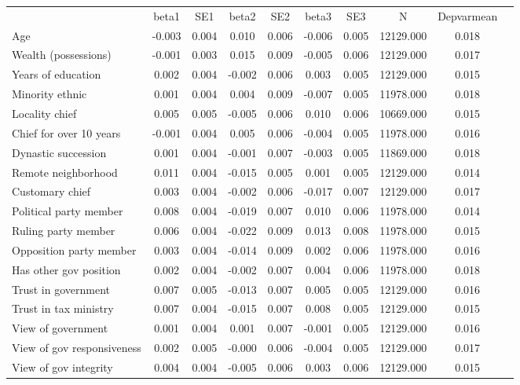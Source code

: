 {\def\sym#1{\ifmmode^{#1}\else\(^{#1}\)\fi} \begin{tabular}{l*{9}{c}} \hline\hline 
& beta1 & SE1 & beta2 & SE2 & beta3 & SE3 & N & Depvarmean \\
Age & -0.003 & 0.004 & 0.010 & 0.006 & -0.006 & 0.005 & 12129.000 & 0.018 \\
Wealth (possessions) & -0.001 & 0.003 & 0.015 & 0.009 & -0.005 & 0.006 & 12129.000 & 0.017 \\
Years of education & 0.002 & 0.004 & -0.002 & 0.006 & 0.003 & 0.005 & 12129.000 & 0.015 \\
Minority ethnic & 0.001 & 0.004 & 0.004 & 0.009 & -0.007 & 0.005 & 11978.000 & 0.018 \\
Locality chief & 0.005 & 0.005 & -0.005 & 0.006 & 0.010 & 0.006 & 10669.000 & 0.015 \\
Chief for over 10 years & -0.001 & 0.004 & 0.005 & 0.006 & -0.004 & 0.005 & 11978.000 & 0.016 \\
Dynastic succession & 0.001 & 0.004 & -0.001 & 0.007 & -0.003 & 0.005 & 11869.000 & 0.018 \\
Remote neighborhood & 0.011 & 0.004 & -0.015 & 0.005 & 0.001 & 0.005 & 12129.000 & 0.014 \\
Customary chief & 0.003 & 0.004 & -0.002 & 0.006 & -0.017 & 0.007 & 12129.000 & 0.017 \\
Political party member & 0.008 & 0.004 & -0.019 & 0.007 & 0.010 & 0.006 & 11978.000 & 0.014 \\
Ruling party member & 0.006 & 0.004 & -0.022 & 0.009 & 0.013 & 0.008 & 11978.000 & 0.015 \\
Opposition party member & 0.003 & 0.004 & -0.014 & 0.009 & 0.002 & 0.006 & 11978.000 & 0.016 \\
Has other gov position & 0.002 & 0.004 & -0.002 & 0.007 & 0.004 & 0.006 & 11978.000 & 0.018 \\
Trust in government & 0.007 & 0.005 & -0.013 & 0.007 & 0.005 & 0.005 & 12129.000 & 0.016 \\
Trust in tax ministry & 0.007 & 0.004 & -0.015 & 0.007 & 0.008 & 0.005 & 12129.000 & 0.015 \\
View of government & 0.001 & 0.004 & 0.001 & 0.007 & -0.001 & 0.005 & 12129.000 & 0.016 \\
View of gov responsiveness & 0.002 & 0.005 & -0.000 & 0.006 & -0.004 & 0.005 & 12129.000 & 0.017 \\
View of gov integrity & 0.004 & 0.004 & -0.005 & 0.006 & 0.003 & 0.006 & 12129.000 & 0.015 \\

\end{tabular}}
